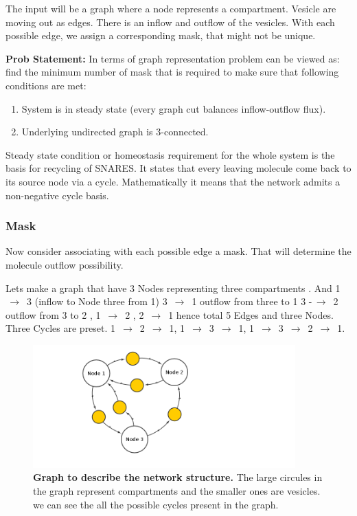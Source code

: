 \documentclass[preprint,12pt]{elsarticle}
\begin{document}
The input will be a graph where a node represents a compartment. Vesicle are moving out as edges. There is an inflow and outflow of the vesicles. With each possible edge, we assign a corresponding mask, that might not be unique. 

\textbf{Prob Statement:} In terms of graph representation problem can be viewed as: find the minimum number of mask that is required to make sure that following conditions are met:
\begin{enumerate}
\item System is in steady state (every graph cut balances inflow-outflow flux).
\item Underlying undirected graph is 3-connected.
\end{enumerate}

Steady state condition or homeostasis requirement for the whole system is the basis for recycling of SNARES. It states that every leaving molecule come back to its source node via a cycle. Mathematically it means that the network admits a non-negative cycle basis. 

\subsubsection{Mask}
Now consider associating with each possible edge a mask. That will determine the molecule outflow possibility.
 
Lets make a graph that have 3 Nodes representing three compartments . And 1 $\,\to\,$ 3 (inflow to Node three from 1) 3 $\,\to\,$ 1 {outflow from three to 1} 3 -$\,\to\,$ 2 {outflow from 3 to 2} , 1 $\,\to\,$ 2 , 2 $\,\to\,$ 1 hence total 5 Edges and three Nodes. 
Three Cycles are preset. 1 $\,\to\,$ 2 $\,\to\,$ 1, 1 $\,\to\,$ 3 $\,\to\,$ 1, 1 $\,\to\,$ 3 $\,\to\,$ 2 $\,\to\,$ 1. 

\begin{figure}[!ht]
  \caption{\textbf{Graph to describe the network structure.} The large circules in the graph represent compartments and the smaller ones are vesicles. we can see the all the possible cycles present in the graph. }
  \centering
   \includegraphics[width=0.90\textwidth]{1.png}
\end{figure}
\end{document}
